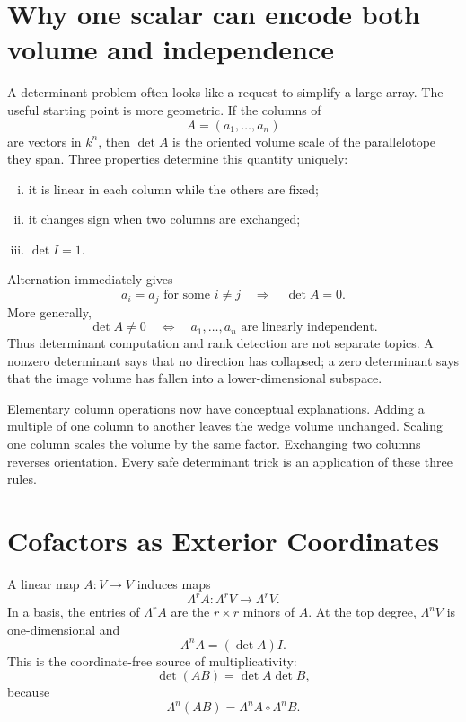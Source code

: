 
\section{Why one scalar can encode both volume and independence}

A determinant problem often looks like a request to simplify a large array.  The useful starting point is more geometric.  If the columns of
\[
  A=(a_1,\ldots,a_n)
\]
are vectors in \(k^n\), then \(\det A\) is the oriented volume scale of the parallelotope they span.  Three properties determine this quantity uniquely:

\begin{enumerate}[(i)]
  \item it is linear in each column while the others are fixed;
  \item it changes sign when two columns are exchanged;
  \item \(\det I=1\).
\end{enumerate}

Alternation immediately gives
\[
  a_i=a_j\text{ for some }i\ne j
  \quad\Longrightarrow\quad
  \det A=0.
\]
More generally,
\[
  \det A\ne0
  \quad\Longleftrightarrow\quad
  a_1,\ldots,a_n\text{ are linearly independent}.
\]
Thus determinant computation and rank detection are not separate topics.  A nonzero determinant says that no direction has collapsed; a zero determinant says that the image volume has fallen into a lower-dimensional subspace.

Elementary column operations now have conceptual explanations.  Adding a multiple of one column to another leaves the wedge volume unchanged.  Scaling one column scales the volume by the same factor.  Exchanging two columns reverses orientation.  Every safe determinant trick is an application of these three rules.

\section{Cofactors as Exterior Coordinates}

A linear map \(A:V\to V\) induces maps
\[
  \Lambda^rA:\Lambda^rV\to\Lambda^rV.
\]
In a basis, the entries of \(\Lambda^rA\) are the \(r\times r\) minors of \(A\).  At the top degree, \(\Lambda^nV\) is one-dimensional and
\[
  \Lambda^nA=(\det A)I.
\]
This is the coordinate-free source of multiplicativity:
\[
  \det(AB)=\det A\det B,
\]
because
\[
  \Lambda^n(AB)=\Lambda^nA\circ\Lambda^nB.
\]

